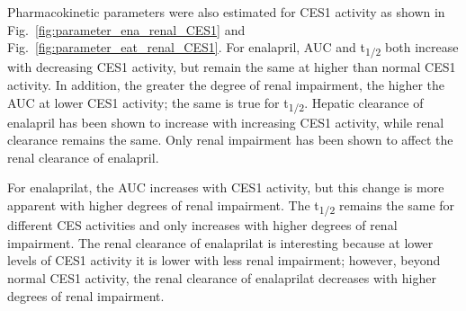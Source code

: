 Pharmacokinetic parameters were also estimated for CES1 activity as shown in Fig.~\ref{fig:parameter_ena_renal_CES1} and Fig.~\ref{fig:parameter_eat_renal_CES1}. For enalapril, AUC and t\textsubscript{1/2} both increase with decreasing CES1 activity, but remain the same at higher than normal CES1 activity. In addition, the greater the degree of renal impairment, the higher the AUC at lower CES1 activity; the same is true for t\textsubscript{1/2}. Hepatic clearance of enalapril has been shown to increase with increasing CES1 activity, while renal clearance remains the same. Only renal impairment has been shown to affect the renal clearance of enalapril.

For enalaprilat, the AUC increases with CES1 activity, but this change is more apparent with higher degrees of renal impairment. The t\textsubscript{1/2} remains the same for different CES activities and only increases with higher degrees of renal impairment. The renal clearance of enalaprilat is interesting because at lower levels of CES1 activity it is lower with less renal impairment; however, beyond normal CES1 activity, the renal clearance of enalaprilat decreases with higher degrees of renal impairment.


